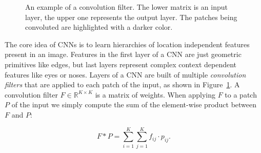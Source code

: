 \begin{figure}[h]
\begin{subfigure}[b]{0.24\textwidth}
  \end{subfigure}  
  \caption{An example of a convolution filter. The lower matrix is an input layer, the upper one represents the output layer. The patches being convoluted are highlighted with a darker color.}
  \label{fig:conv_no_padding_no_strides}
\end{figure}

The core idea of CNNs is to learn hierarchies of location independent features present in an image. Features in the first layer of a CNN are just geometric primitives like edges, but last layers represent complex context dependent features like eyes or noses. Layers of a CNN are built of multiple \textit{convolution filters} that are applied to each patch of the input, as shown in Figure~\ref{fig:conv_no_padding_no_strides}. A convolution filter $F \in \mathbb{R}^{K \times K}$ is a matrix of weights. When applying $F$ to a patch $P$ of the input we simply compute the sum of the element-wise product between $F$ and $P$:

\begin{equation}
	F * P  = \sum_{i=1}^K \sum_{j=1}^K f_{ij} \cdot p_{ij}.
\end{equation}

